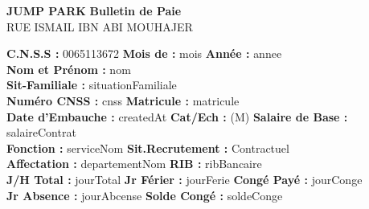 \documentclass[a4paper,landscape]{article}
\begin{document}
\noindent %
\begin{minipage}{0.48\linewidth} %
    \noindent
\textbf{JUMP PARK}\hfill
\textbf{Bulletin de Paie} \\[0.25cm]
RUE ISMAIL IBN ABI MOUHAJER


\noindent
\textbf{C.N.S.S :} {0065113672} \hfill \textbf{Mois de :} {{ mois }} \hfill \textbf{Année :} {{ annee }}\\[0.2cm]


\noindent
\noindent
\textbf{Nom et Prénom :} {{ nom }}\\[0.1cm]
\textbf{Sit-Familiale :} {{ situationFamiliale }}\\[0.1cm]
\textbf{Numéro CNSS :} {{ cnss }} \hfill \textbf{Matricule :} {{ matricule }}\\[0.1cm]
\textbf{Date d'Embauche :} {{ createdAt }} \hfill 
\textbf{Cat/Ech :} (M) \hfill 
\textbf{Salaire de Base :} {{ salaireContrat }}\\[0.1cm]
\textbf{Fonction :} {{ serviceNom }} \hfill 
\textbf{Sit.Recrutement :} Contractuel\\[0.1cm]
\textbf{Affectation :} {{ departementNom }} \hfill 
\textbf{RIB :} {{ ribBancaire }}\\[0.1cm]
\textbf{J/H Total :} {{ jourTotal }} \hfill
\textbf{Jr Férier :} {{ jourFerie }} \hfill
\textbf{Congé Payé :} {{ jourConge }}\\[0.1cm]
\textbf{Jr Absence :} {{ jourAbcense }} \hfill
\textbf{Solde Congé :} {{ soldeConge }}




\end{minipage}
\end{document}
